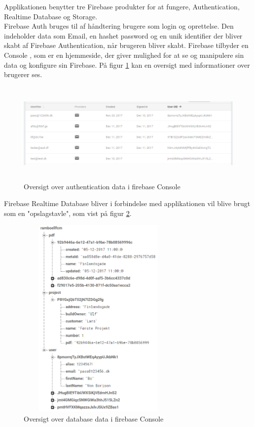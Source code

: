 Applikationen benytter tre Firebase produkter for at fungere, Authentication, Realtime Database og Storage.\\

 Firebase Auth\cite{FirebaseAuth} bruges til af håndtering brugere som login og oprettelse. Den indeholder data som Email, en hashet password og en unik identifier der bliver skabt af Firebase Authentication, når brugeren bliver skabt. Firebase tilbyder en Console , som er en hjemmeside, der giver mulighed for at se og manipulere sin data og konfigure sin Firebase. På figur \ref{fig:FirebaseAuthPNG} kan en oversigt med informationer over brugerer ses. 
\begin{figure}[H] %
	\centering
	\includegraphics[height=5cm, width=15cm]{../ArkitekturDesign/Design/Firebase/FirebaseAuth.PNG}
	\caption{Oversigt over authentication data i firebase Console}
	\label{fig:FirebaseAuthPNG}
\end{figure}

Firebase Realtime Database bliver i forbindelse med applikationen vil blive brugt som en "opslagstavle", som vist på figur \ref{fig:FirebaseDBPNG}.  
 
\begin{figure}[H] %
	\centering
	\includegraphics[height=10cm, width=8cm]{../ArkitekturDesign/Design/Firebase/FirebaseDB.PNG}
	\caption{Oversigt over database data i firebase Console}
	\label{fig:FirebaseDBPNG}
\end{figure}

